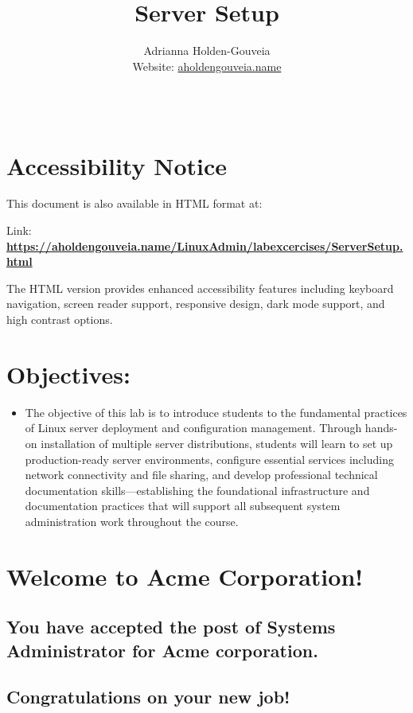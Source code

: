 \documentclass[12pt]{article}
\title{Server Setup}
\author{
        Adrianna Holden-Gouveia \\
        Website: \href{https://aholdengouveia.name}{aholdengouveia.name}\\ 
        \date{\vspace{-5ex}}
        \faGithub {: aholdengouveia} \\
        }
\begin{document}
    

\maketitle



\section*{Accessibility Notice}
This document is also available in HTML format at:

Link: \href{https://aholdengouveia.name/LinuxAdmin/labexcercises/ServerSetup.html}{\textbf{https://aholdengouveia.name/LinuxAdmin/labexcercises/ServerSetup.html}}

The HTML version provides enhanced accessibility features including keyboard navigation, screen reader support, responsive design, dark mode support, and high contrast options.

\section*{Objectives:}
\begin{itemize}
    \item The objective of this lab is to introduce students to the fundamental practices of Linux server deployment and configuration management. Through hands-on installation of multiple server distributions, students will learn to set up production-ready server environments, configure essential services including network connectivity and file sharing, and develop professional technical documentation skills—establishing the foundational infrastructure and documentation practices that will support all subsequent system administration work throughout the course.
\end{itemize}
\section*{Welcome to Acme Corporation!}
\subsection*{You have accepted the post of Systems Administrator for Acme corporation.} 
\subsection*{Congratulations on your new job!}
\end{document}
